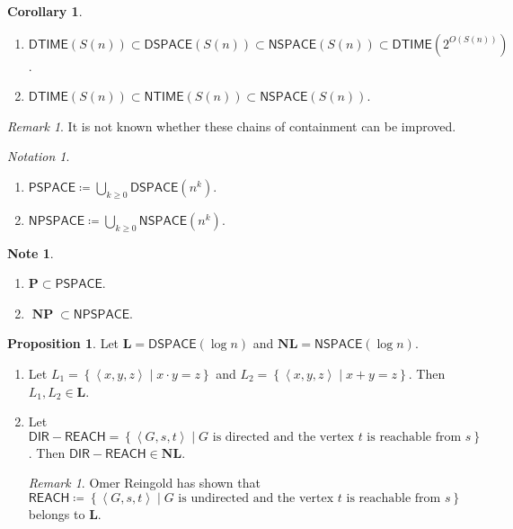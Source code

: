 \documentclass[10pt,letterpaper,cm]{nupset}
\theoremstyle{definition}
\newtheorem{note}[definition]{Note}
\theoremstyle{theorem}
\newtheorem{prop}[definition]{Proposition}
\newtheorem{corollary}[definition]{Corollary}
\theoremstyle{remark}
\newtheorem{remark}[definition]{Remark}
\newtheorem*{notation}{Notation}
\newcommand{\1}{\mathbf{1}}
\newcommand{\0}{\vec 0}
\DeclareMathOperator{\NP}{\mathbf{NP}}
\begin{document}
\begin{corollary} $ $
\begin{enumerate}
\item $\mathsf{DTIME}(S(n)) \subset \mathsf{DSPACE}(S(n)) \subset \mathsf{NSPACE}(S(n)) \subset \mathsf{DTIME}\left(2^{O(S(n))}\right)$.
\item $\mathsf{DTIME}(S(n)) \subset \mathsf{NTIME}(S(n)) \subset \mathsf{NSPACE}(S(n))$.
\end{enumerate}
\end{corollary}

\begin{remark}
It is not known whether these chains of containment can be improved. 
\end{remark}

\begin{notation} $ $
\begin{enumerate}
\item $\mathsf{PSPACE} \coloneqq \bigcup_{k\geq 0} \mathsf{DSPACE}(n^k)$.
\item $\mathsf{NPSPACE} \coloneqq \bigcup_{k \geq 0} \mathsf{NSPACE}(n^k)$.
\end{enumerate}
\end{notation}

\begin{note} $ $
\begin{enumerate}
\item $\mathbf{P} \subset \mathsf{PSPACE}$.
\item $\NP \subset \mathsf{NPSPACE}$.
\end{enumerate}
\end{note}

\begin{prop}
Let $\mathbf{L} = \mathsf{DSPACE}(\log{n})$ and $\mathbf{NL}= \mathsf{NSPACE}(\log{n})$. 
\begin{enumerate}
\item Let $L_1 = \left\{\left\langle x,y,z \right\rangle \mid x \cdot y = z\right\}$ and $L_2 = \left\{\left\langle x,y,z \right\rangle \mid x+y = z\right\}$. Then $L_1, L_2 \in \mathbf{L}$.
\item Let $\mathsf{DIR{-}REACH} = \left\{\left\langle G, s, t \right\rangle \mid G\text{ is directed and the vertex }t\text{ is reachable from }s\right\}$. Then $\mathsf{DIR{-}REACH}  \in \mathbf{NL}$.
\begin{remark}
Omer Reingold has shown that $$\mathsf{REACH} \coloneqq  \left\{\left\langle G, s, t \right\rangle \mid G\text{ is undirected and the vertex }t\text{ is reachable from }s\right\}$$ belongs to $\mathbf{L}$.
\end{remark}
\end{enumerate}
\end{prop}
\end{document}
